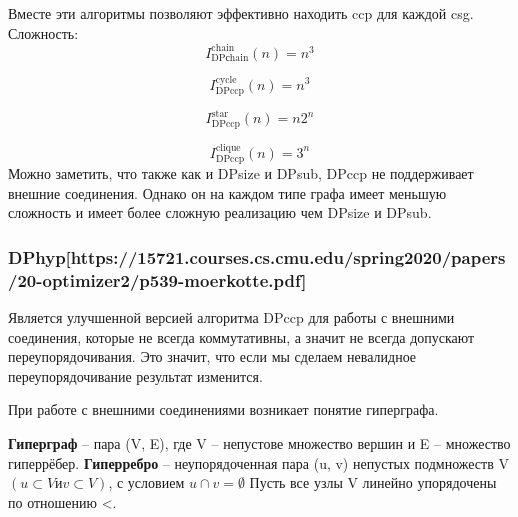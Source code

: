 \documentclass[12pt]{article}
\begin{document}
\begin{flushleft}
Вместе эти алгоритмы позволяют эффективно находить ccp для каждой csg.
Сложность:
\[
I^{\text{chain}}_{\text{DPсhain}}(n) =
n^3
\]

\[
I^{\text{cycle}}_{\text{DPccp}}(n) =
n^3
\]

\[
I^{\text{star}}_{\text{DPccp}}(n) =
n2^n
\]

\[
I^{\text{clique}}_{\text{DPccp}}(n) =
3^n
\]
Можно заметить, что также как и DPsize и DPsub, DPccp не поддерживает внешние соединения.
Однако он на каждом типе графа имеет меньшую сложность и имеет более сложную
реализацию чем DPsize и DPsub.

\centering \subsubsection*{DPhyp[https://15721.courses.cs.cmu.edu/spring2020/papers/20-optimizer2/p539-moerkotte.pdf]}
\raggedright

Является улучшенной версией алгоритма DPccp для работы
с внешними соединения, которые не всегда коммутативны, а значит 
не всегда допускают переупорядочивания. Это значит, что если
мы сделаем невалидное переупорядочивание результат изменится.

\begin{center}
\end{center}

При работе с внешними соединениями возникает понятие гиперграфа.

\textbf{Гиперграф} -- пара (V, E), где V -- непустове множество вершин 
и E -- множество гиперрёбер. 
\textbf{Гиперребро} -- неупорядоченная пара (u, v)
непустых подмножеств V$( u \subset V и v \subset V)$, с условием $u \cap v = \emptyset$
Пусть все узлы V линейно упорядочены по отношению <.
\begin{center}
\end{center}
\end{flushleft}
\end{document}
